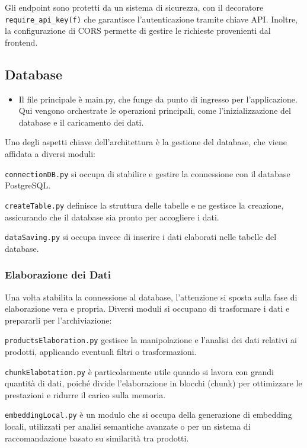 Gli endpoint sono protetti da un sistema di sicurezza, con il decoratore \texttt{require\_api\_key(f)} che garantisce l’autenticazione tramite chiave API. Inoltre, la configurazione di CORS permette di gestire le richieste provenienti dal frontend.

\subsection{Database}
\begin{itemize}
\item Il file principale è main.py, che funge da punto di ingresso per l'applicazione. Qui vengono orchestrate le operazioni principali, come l'inizializzazione del database e il caricamento dei dati.
\end{itemize}
Uno degli aspetti chiave dell'architettura è la gestione del database, che viene affidata a diversi moduli:

\texttt{connectionDB.py} si occupa di stabilire e gestire la connessione con il database PostgreSQL.

\texttt{createTable.py} definisce la struttura delle tabelle e ne gestisce la creazione, assicurando che il database sia pronto per accogliere i dati.

\texttt{dataSaving.py} si occupa invece di inserire i dati elaborati nelle tabelle del database.

\subsubsection{Elaborazione dei Dati}
Una volta stabilita la connessione al database, l'attenzione si sposta sulla fase di elaborazione vera e propria. Diversi moduli si occupano di trasformare i dati e prepararli per l'archiviazione:

\item \texttt{productsElaboration.py} gestisce la manipolazione e l'analisi dei dati relativi ai prodotti, applicando eventuali filtri o trasformazioni.

\item \texttt{chunkElabotation.py} è particolarmente utile quando si lavora con grandi quantità di dati, poiché divide l'elaborazione in blocchi (chunk) per ottimizzare le prestazioni e ridurre il carico sulla memoria.

\item \texttt{embeddingLocal.py} è un modulo che si occupa della generazione di embedding locali,  utilizzati per analisi semantiche avanzate o per un sistema di raccomandazione basato su similarità tra prodotti.

